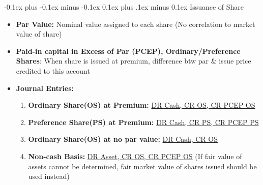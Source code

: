 \documentclass[landscape]{article}
\makeatletter
\renewcommand{\subsection}{\@startsection{subsection}{2}{0mm}%
  {-0.1ex plus -0.1ex minus -0.1ex}%
  {0.1ex plus .1ex minus 0.1ex}%
{\normalfont\scriptsize\bfseries}}
\makeatother
\begin{document}
\begin{multicols}{6}
    \subsection{Issuance of Share}
    \begin{itemize}
      \item \textbf{Par Value:} Nominal value assigned to each share (No correlation to market value of share)
      \item \textbf{Paid-in capital in Excess of Par (PCEP), Ordinary/Preference Shares}: When share is issued at premium, difference btw par \& issue price credited to this account
      \item \textbf{Journal Entries:}
      \begin{enumerate}
        \item \textbf{Ordinary Share(OS) at Premium:} \underline{DR Cash, CR OS, CR PCEP OS}
        \item \textbf{Preference Share(PS) at Premium:} \underline{DR Cash, CR PS, CR PCEP PS}
        \item \textbf{Ordinary Share(OS) at no par value:} \underline{DR Cash, CR OS}
        \item \textbf{Non-cash Basis:} \underline{DR Asset, CR OS, CR PCEP OS} (If fair value of assets cannot be determined, fair market value of shares issued should be used instead)
      \end{enumerate}
    \end{itemize}


\end{multicols}
\end{document}
